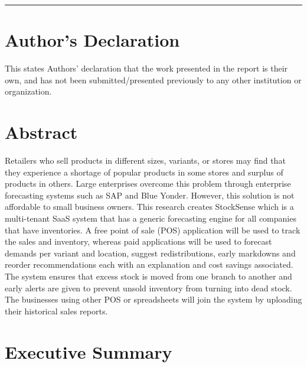 \documentclass{StockSense}
\begin{document}

\vfill
\hrule

\section*{Author's Declaration}

This states Authors’ declaration that the work presented in the report is their own, and has not been submitted/presented previously to any other institution or organization.

\pagebreak


\section*{Abstract}
\thispagestyle{empty}

Retailers who sell products in different sizes, variants, or stores may find that they experience a shortage of popular products in some stores and surplus of products in others. Large enterprises overcome this problem through enterprise forecasting systems such as SAP and Blue Yonder. However, this solution is not affordable to small business owners. This research creates StockSense which is a multi-tenant SaaS system that has a generic forecasting engine for all companies that have inventories. A free point of sale (POS) application will be used to track the sales and inventory, whereas paid applications will be used to forecast demands per variant and location, suggest redistributions, early markdowns and reorder recommendations each with an explanation and cost savings associated. The system ensures that excess stock is moved from one branch to another and early alerts are given to prevent unsold inventory from turning into dead stock. The businesses using other POS or spreadsheets will join the system by uploading their historical sales reports.

\pagebreak

\section*{Executive Summary}
\thispagestyle{empty}
\end{document}
